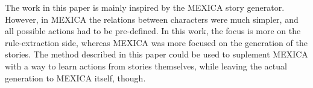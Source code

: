 
The work in this paper is mainly inspired by the MEXICA story generator. %
However, in MEXICA the relations between characters were much simpler, and 
all possible actions had to be pre-defined. In this work, the focus is more on
the rule-extraction side, whereas MEXICA was more focused on the generation of
the stories. The method described in this paper could be used to suplement
MEXICA with a way to learn actions from stories themselves, while leaving the
actual generation to MEXICA itself, though.
